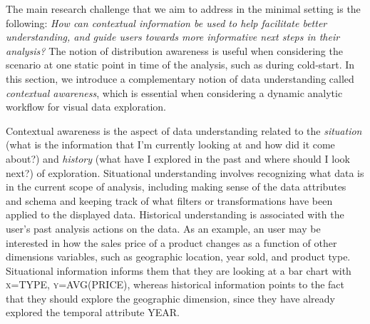 \documentclass[11pt]{article}
\begin{document}
\par The main research challenge that we aim to address in the minimal setting is the following: {\em How can contextual information be used to help facilitate better understanding, and guide users towards more informative next steps in their analysis?} The notion of distribution awareness is useful when considering the scenario at one static point in time of the analysis, such as during cold-start. In this section, we introduce a complementary notion of data understanding called \textit{contextual awareness}, which is essential when considering a dynamic analytic workflow for visual data exploration.
 
\par Contextual awareness is the aspect of 
data understanding related to 
the \textit{situation} (what is the information 
that I'm currently looking at and how did it come about?) 
and \textit{history} (what have I explored in the past 
and where should I look next?) of exploration. 
Situational understanding involves recognizing 
what data is in the current 
scope of analysis, 
including making sense of the data attributes 
and schema and keeping track of what filters or 
transformations have been applied to the displayed data. 
Historical understanding is associated with 
the user's past analysis actions on the data. 
As an example, an user may be interested 
in how the sales price of a product changes 
as a function of other dimensions variables, 
such as geographic location, year sold, and product type. 
Situational information informs them that they are 
looking at a bar chart with \textsc{x=TYPE}, \textsc{y=AVG(PRICE)}, 
whereas historical information points 
to the fact that they should explore the 
geographic dimension, since they have 
already explored the temporal attribute \textsc{YEAR}.
\end{document}
